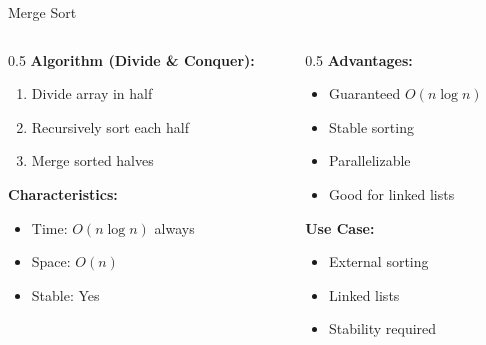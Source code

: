 \documentclass[aspectratio=169,xcolor=dvipsnames]{beamer}
\begin{document}
\begin{frame}{Merge Sort}
  \begin{columns}
    \begin{column}{0.5\textwidth}
      \textbf{Algorithm (Divide \& Conquer):}
      \begin{enumerate}
        \item Divide array in half
        \item Recursively sort each half
        \item Merge sorted halves
      \end{enumerate}

      \vspace{0.3cm}
      \textbf{Characteristics:}
      \begin{itemize}
        \item Time: $O(n \log n)$ always
        \item Space: $O(n)$
        \item Stable: Yes
      \end{itemize}
    \end{column}

    \begin{column}{0.5\textwidth}
      \textbf{Advantages:}
      \begin{itemize}
        \item Guaranteed $O(n \log n)$
        \item Stable sorting
        \item Parallelizable
        \item Good for linked lists
      \end{itemize}

      \vspace{0.3cm}
      \textbf{Use Case:}
      \begin{itemize}
        \item External sorting
        \item Linked lists
        \item Stability required
      \end{itemize}
    \end{column}
  \end{columns}
\end{frame}
\end{document}
